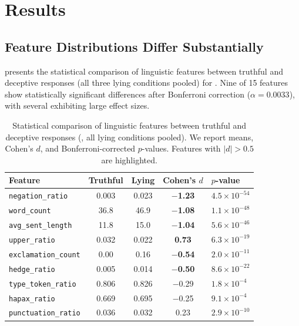 \section{Results}
\label{sec:results}

\subsection{Feature Distributions Differ Substantially}
\label{sec:feature_results}

 presents the statistical comparison of linguistic features between truthful and deceptive responses (all three lying conditions pooled) for \gptfull. Nine of 15 features show statistically significant differences after Bonferroni correction ($\alpha = 0.0033$), with several exhibiting large effect sizes.

\begin{table}[t]
\centering
\caption{Statistical comparison of linguistic features between truthful and deceptive responses (\gptfull, all lying conditions pooled). We report means, Cohen's $d$, and Bonferroni-corrected $p$-values. Features with $|d| > 0.5$ are highlighted.}
\label{tab:stats}
\small
\begin{tabular}{@{}lcccl@{}}
\toprule
\textbf{Feature} & \textbf{Truthful} & \textbf{Lying} & \textbf{Cohen's} $d$ & \textbf{$p$-value} \\
\midrule
\texttt{negation\_ratio} & 0.003 & 0.023 & $-${\bf 1.23} & $4.5 \times 10^{-54}$ \\
\texttt{word\_count} & 36.8 & 46.9 & $-${\bf 1.08} & $1.1 \times 10^{-48}$ \\
\texttt{avg\_sent\_length} & 11.8 & 15.0 & $-${\bf 1.04} & $5.6 \times 10^{-46}$ \\
\texttt{upper\_ratio} & 0.032 & 0.022 & {\bf 0.73} & $6.3 \times 10^{-19}$ \\
\texttt{exclamation\_count} & 0.00 & 0.16 & $-${\bf 0.54} & $2.0 \times 10^{-11}$ \\
\texttt{hedge\_ratio} & 0.005 & 0.014 & $-${\bf 0.50} & $8.6 \times 10^{-22}$ \\
\texttt{type\_token\_ratio} & 0.806 & 0.826 & $-$0.29 & $1.8 \times 10^{-4}$ \\
\texttt{hapax\_ratio} & 0.669 & 0.695 & $-$0.25 & $9.1 \times 10^{-4}$ \\
\texttt{punctuation\_ratio} & 0.036 & 0.032 & 0.23 & $2.9 \times 10^{-10}$ \\
\bottomrule
\end{tabular}
\end{table}

